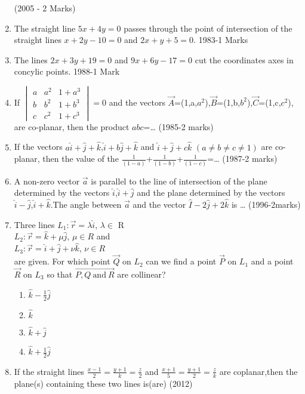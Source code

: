 \begin{enumerate}
\hfill{(2005 - 2 Marks)}
    \item The straight line $5x+4y=0$ passes through the point of intersection of the straight lines $x+2y-10=0$ and $2x+y+5=0$.
    \hfill{1983-1 Marks}
    \item The lines $2x+3y+19=0$ and $9x+6y-17=0$ cut the coordinates axes in concylic points.
    \hfill{1988-1 Mark}
    \item If $ 
 \begin{vmatrix}
a & a^2 & 1+a^3\\
b & b^2 & 1+b^3\\
c & c^2 & 1+c^3
\end{vmatrix}
=0$ and the vectors $\vec{A}$=(1,a,$a^2$),$\vec{B}$=(1,b,$b^2$),$\vec{C}$=(1,c,$c^2$), are co-planar, then the product $abc$=\dots
\hfill{(1985-2 marks)}
\item If the vectors $a\hat{i}+\hat{j}+\hat{k}$,$\hat{i}+b\hat{j}+\hat{k}$ and $\hat{i}+\hat{j}+c\hat{k}$ $(a\neq b\neq c\neq 1)$ are co-planar, then the value of the $\frac{1}{(1-a)}$+$\frac{1}{(1-b)}$+$\frac{1}{(1-c)}$=\dots
\hfill{(1987-2 marks)}
\item A non-zero vector $\vec{a}$ is parallel to the line of intersection of the plane determined by the vectors $\hat{i}$,$\hat{i}+\hat{j}$ and the plane determined by the vectors $\hat{i}-\hat{j}$,$\hat{i}+\hat{k}$.The angle between $\vec{a}$ and the vector $\hat{I}-2\hat{j}+2\hat{k}$ is \dots
\hfill{(1996-2marks)}
\item %
	Three lines $L_1:\vec{r}=\lambda\hat{i}$, $\lambda\in$ R\\
		$L_2:\vec{r}=\hat{k}+\mu\hat{j}$, $\mu\in R$ and\\
		$L_3:\vec{r}=\hat{i}+\hat{j}+\nu\hat{k}$, $\nu\in R$\\
		are given. For which point $\vec{Q}$ on $L_2$ can we find a point $\vec{P}$ on $L_1$ and a point $\vec{R}$ on $L_3$ so that $\vec{P,Q\ \text{and}\ R}$ are collinear? \hfill{}\\
  \begin{enumerate}
	  \item $\hat{k}-\frac{1}{2}\hat{j}$
	  \item $\hat{k}$
	  \item $\hat{k}+\hat{j}$
	  \item $\hat{k}+\frac{1}{2}\hat{j}$
   \end{enumerate}
	\item If the straight lines $\frac{x-1}{2}=\frac{y+1}{k}=\frac{z}{2}$ and $\frac{x+1}{5}=\frac{y+1}{2}=\frac{z}{k}$ are coplanar,then the plane(s) containing these two lines is(are) \hfill{(2012)}

\end{enumerate}
